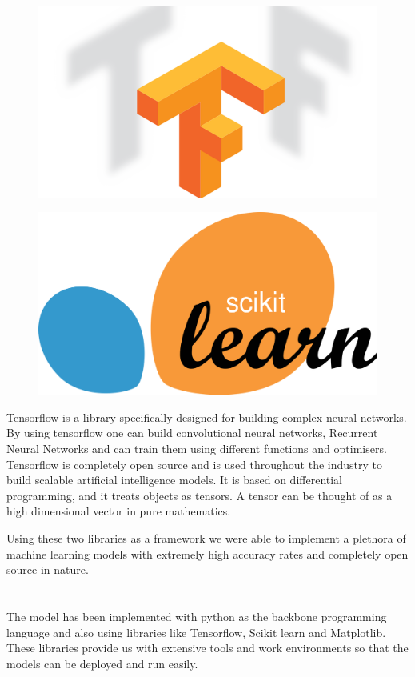 \documentclass[12pt]{article}
\newcommand{\nd}{\noindent}
\newcommand{\secsize}{\fontsize{15pt}{12pt}\selectfont}
\begin{document}
\begin{figure}[h]
\centering
\begin{minipage}{.5\textwidth}
  \centering
  \includegraphics[width=.8\linewidth]{tf.png}
  \label{fig:test1}
\end{minipage}%
\begin{minipage}{.5\textwidth}
  \centering
  \includegraphics[width=.8\linewidth]{sk.png}
  \label{fig:test2}
\end{minipage}
\end{figure}

\nd Tensorflow is a library specifically designed for building complex neural networks. By using tensorflow one can build convolutional neural networks, Recurrent Neural Networks and can train them using different functions and optimisers. Tensorflow is completely open source and is used throughout the industry to build scalable artificial intelligence models. It is based on differential programming, and it treats objects as tensors. A tensor can be thought of as a high dimensional vector in pure mathematics. 

\nd Using these two libraries as a framework we were able to implement a plethora of machine learning models with extremely high accuracy rates and completely open source in nature. 

\newpage 
\section{\textbf{\secsize{IMPLEMENTATION}}}
The model has been implemented with python as the backbone programming language and also using libraries like Tensorflow, Scikit learn and Matplotlib. These libraries provide us with extensive tools and work environments so that the models can be deployed and run easily. 
\end{document}
